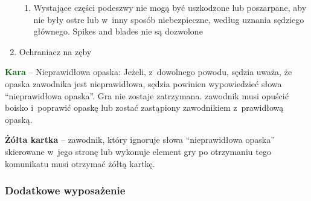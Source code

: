 \documentclass[12pt]{article}
\newcommand\yellowcard[1]{\bgroup\textcolor{darkyellow}{\textbf{#1}}}
\newcommand\other[1]{\bgroup\textcolor{darkgreen}{\textbf{#1}}}
\begin{document}
\begin{enumerate}
	      \begin{enumerate}
		      \item
		            Wystające części podeszwy nie mogą być uszkodzone lub poszarpane,
		            aby nie były ostre lub w~inny sposób niebezpieczne, według uznania
		            sędziego głównego. Spikes and blades nie są dozwolone
	      \end{enumerate}
	\item
	      Ochraniacz na zęby
\end{enumerate}

\other{Kara} -- Nieprawidłowa opaska: Jeżeli, z~dowolnego powodu, sędzia
uważa, że opaska zawodnika jest nieprawidłowa, sędzia powinien
wypowiedzieć słowa ``nieprawidłowa opaska''. Gra nie zostaje zatrzymana.
zawodnik musi opuścić boisko i~poprawić opaskę lub zostać zastąpiony
zawodnikiem z~prawidłową opaską.

\yellowcard{Żółta kartka} -- zawodnik, który ignoruje słowa ``nieprawidłowa
opaska'' skierowane w~jego stronę lub wykonuje element gry po otrzymaniu
tego komunikatu musi otrzymać żółtą kartkę.

\subsubsection{Dodatkowe wyposażenie}
\end{document}
